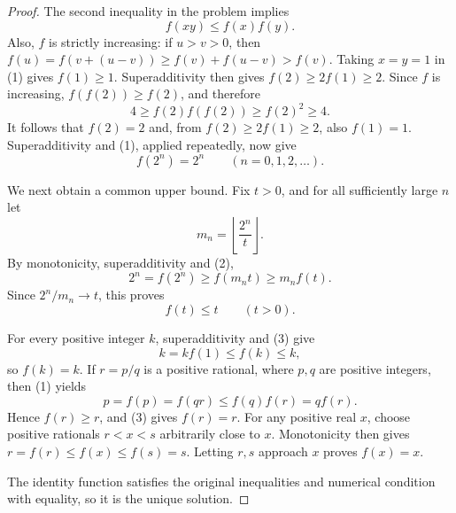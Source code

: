 
\begin{dlsummary}[title={\bfseries Solution 4. The Dyadic Lock},breakable]

\begin{proof}
The second inequality in the problem implies
\[
f(xy)\leq f(x)f(y). \tag{1}
\]
Also, $f$ is strictly increasing: if $u>v>0$, then
$f(u)=f(v+(u-v))\geq f(v)+f(u-v)>f(v)$.
Taking $x=y=1$ in (1) gives $f(1)\geq1$. Superadditivity then gives
$f(2)\geq2f(1)\geq2$. Since $f$ is increasing,
$f(f(2))\geq f(2)$, and therefore
\[
4\geq f(2)f(f(2))\geq f(2)^2\geq4.
\]
It follows that $f(2)=2$ and, from $f(2)\geq2f(1)\geq2$, also
$f(1)=1$. Superadditivity and (1), applied repeatedly, now give
\[
f(2^n)=2^n\qquad(n=0,1,2,\ldots). \tag{2}
\]

We next obtain a common upper bound. Fix $t>0$, and for all sufficiently
large $n$ let
\[
m_n=\left\lfloor\frac{2^n}{t}\right\rfloor.
\]
By monotonicity, superadditivity and (2),
\[
2^n=f(2^n)\geq f(m_nt)\geq m_nf(t).
\]
Since $2^n/m_n\to t$, this proves
\[
f(t)\leq t\qquad(t>0). \tag{3}
\]

For every positive integer $k$, superadditivity and (3) give
\[
k=kf(1)\leq f(k)\leq k,
\]
so $f(k)=k$. If $r=p/q$ is a positive rational, where $p,q$ are
positive integers, then (1) yields
\[
p=f(p)=f(qr)\leq f(q)f(r)=qf(r).
\]
Hence $f(r)\geq r$, and (3) gives $f(r)=r$. For any positive real $x$,
choose positive rationals $r<x<s$ arbitrarily close to $x$. Monotonicity
then gives $r=f(r)\leq f(x)\leq f(s)=s$. Letting $r,s$ approach $x$
proves $f(x)=x$.

The identity function satisfies the original inequalities and numerical
condition with equality, so it is the unique solution.
\end{proof}

\end{dlsummary}